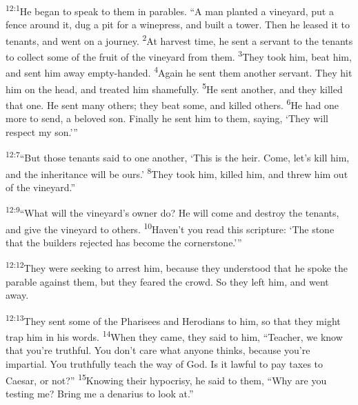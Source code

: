 \documentclass[openany,12pt,english]{book}
\newenvironment{para}{\par\pretolerance=100\tolerance=200\setlength{\emergencystretch}{0.6em}\relax}{\par}
\begin{document}
\begin{para}
    \textsuperscript{12:1}\thinspace{}He be\-gan to speak to them in parables. “A man planted a vine\-yard, put a fence a\-round it, dug a pit for a wine\-press, and built a tow\-er. Then he leased it to tenants, and went on a jour\-ney.
    \textsuperscript{2}\thinspace{}At har\-vest time, he sent a serv\-ant to the tenants to col\-lect some of the fruit of the vine\-yard from them.
    \textsuperscript{3}\thinspace{}They took him, beat him, and sent him a\-way empty-handed.
    \textsuperscript{4}\thinspace{}A\-gain he sent them an\-oth\-er serv\-ant. They hit him on the head, and treated him shamefully.
    \textsuperscript{5}\thinspace{}He sent an\-oth\-er, and they killed that one. He sent man\-y others; they beat some, and killed others.
    \textsuperscript{6}\thinspace{}He had one more to send, a be\-lov\-ed son. Fi\-nal\-ly he sent him to them, say\-ing, ‘They will re\-spect my son.’”
\end{para}

\begin{para}
    \textsuperscript{12:7}\thinspace{}“But those tenants said to one an\-oth\-er, ‘This is the heir. Come, let's kill him, and the in\-her\-it\-ance will be ours.’
    \textsuperscript{8}\thinspace{}They took him, killed him, and threw him out of the vine\-yard.”
\end{para}

\begin{para}
    \textsuperscript{12:9}\thinspace{}“What will the vineyard's own\-er do? He will come and de\-stroy the tenants, and give the vine\-yard to others.
    \textsuperscript{10}\thinspace{}Have\-n't you read this scrip\-ture: ‘The stone that the builders rejected has be\-come the cor\-ner\-stone.’”
\end{para}

\begin{para}
    \textsuperscript{12:12}\thinspace{}They were seek\-ing to ar\-rest him, be\-cause they un\-der\-stood that he spoke the par\-a\-ble a\-gainst them, but they feared the crowd. So they left him, and went a\-way.
\end{para}

\bigskip{}

\begin{para}
    \textsuperscript{12:13}\thinspace{}They sent some of the Pharisees and Herodians to him, so that they might trap him in his words.
    \textsuperscript{14}\thinspace{}When they came, they said to him, “Teach\-er, we know that you're truth\-ful. You don't care what any\-one thinks, be\-cause you're im\-par\-tial. You truthfully teach the way of God. Is it law\-ful to pay taxes to Caesar, or not?”
    \textsuperscript{15}\thinspace{}Know\-ing their hy\-poc\-ri\-sy, he said to them, “Why are you testing me? Bring me a de\-nar\-i\-us to look at.”
\end{para}
\end{document}
